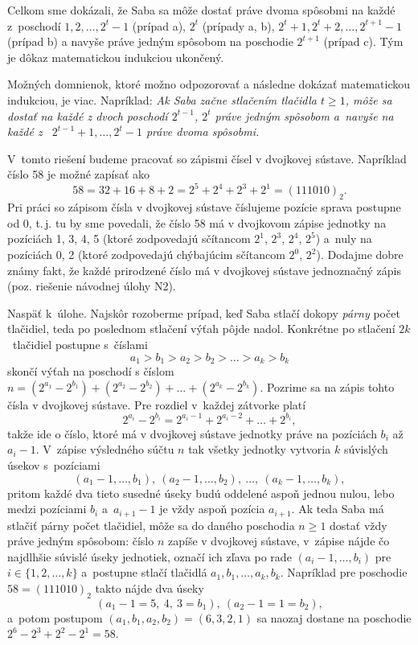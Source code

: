 {\smallskip\noindent
Celkom sme dokázali, že Saba sa môže dostať práve dvoma spôsobmi na každé z~poschodí $1,2,\dots,2^t-1$ (prípad a), $2^t$ (prípady a, b), $2^t+1,2^t+2,\dots,2^{t+1}-1$ (prípad b) a navyše práve jedným spôsobom na poschodie $2^{t+1}$ (prípad c). Tým je dôkaz matematickou indukciou ukončený.

\poznamka
Možných domnienok, ktoré možno odpozorovať a následne dokázať matematickou indukciou, je viac.
Napríklad:
{\sl Ak Saba začne stlačením tlačidla $t\ge 1$, môže sa dostať na každé z dvoch poschodí $2^{t-1}$, $2^t$ práve jedným spôsobom a~navyše na každé z~ $2^{t-1}+1,\dots,2^t-1$ práve dvoma spôsobmi.}

\ineriesenie
V~tomto riešení budeme pracovať so zápismi čísel v dvojkovej sústave. Napríklad číslo 58 je možné zapísať ako
$$
58=32+16+8+2 = 2^5+2^4+2^3+2^1 = (111010)_2.
$$
Pri práci so zápisom čísla v dvojkovej sústave číslujeme pozície sprava postupne od 0, t.\,j. tu by sme povedali, že číslo 58 má v dvojkovom zápise jednotky na pozíciách 1, 3, 4, 5 (ktoré zodpovedajú sčítancom $2^1$, $2^3$, $2^4$, $2^5$) a~nuly na pozíciách 0, 2 (ktoré zodpovedajú chýbajúcim sčítancom $2^0$, $2^2$).
Dodajme dobre známy fakt, že každé prirodzené číslo má v dvojkovej sústave jednoznačný zápis (poz. riešenie návodnej úlohy N2).

Naspäť k~úlohe.
Najskôr rozoberme prípad, keď Saba stlačí dokopy {\it párny} počet tlačidiel, teda po poslednom stlačení výťah pôjde nadol. Konkrétne po stlačení $2k$~tlačidiel postupne s~číslami
$$
a_1 > b_1 > a_2 > b_2 > \dots > a_k > b_k
$$
skončí výťah na poschodí s číslom
$n=(2^{a_1} - 2^{b_1})+(2^{a_2} - 2^{b_2})+\dots+(2^{a_k} - 2^{b_k})$.
Pozrime sa na zápis tohto čísla v dvojkovej sústave.
Pre rozdiel v~každej zátvorke platí
$$
2^{a_i} - 2^{b_i} = 2^{a_i-1} + 2^{a_i-2} + \dots + 2^{b_i},
$$
takže ide o číslo, ktoré má v dvojkovej sústave jednotky práve na pozíciách $b_i$ až $a_i-1$. V~zápise výsledného súčtu $n$ tak všetky jednotky vytvoria $k$ súvislých úsekov s~pozíciami
$$
(a_1-1, \dots, b_1),\ (a_2-1,\dots, b_2),\ \dots,\ (a_k-1,\dots, b_k),
$$
pritom každé dva tieto susedné úseky budú oddelené aspoň jednou nulou,
lebo medzi pozíciami $b_i$ a~$a_{i+1}-1$ je vždy aspoň pozícia $a_{i+1}$.
Ak teda Saba má stlačiť párny počet tlačidiel, môže sa do daného poschodia $n\geq1$ dostať vždy práve jedným spôsobom: číslo $n$ zapíše v dvojkovej sústave,
v~zápise nájde čo najdlhšie súvislé úseky jednotiek, označí ich zľava po rade
$(a_{i}-1,\dots, b_{i})$ pre $i\in\{1,2,\dots,k\}$ a~postupne stlačí tlačidlá $a_1,b_1,\dots,a_k,b_k$. Napríklad pre poschodie $58=(111010)_2$ takto nájde dva úseky
$$
(a_1-1 = 5,\ 4,\ 3 = b_1),\ (a_2-1 = 1 = b_2),
$$
a~potom postupom $(a_1,b_1,a_2,b_2)=(6,3,2,1)$ sa naozaj dostane na poschodie $2^6-2^3+2^2-2^1=58$.

}
